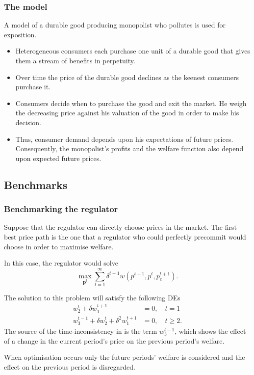 \documentclass{beamer}
\begin{document}
\begin{frame}
  \frametitle{The model}
  A model of a durable good producing monopolist who pollutes is used
  for exposition.
  \begin{itemize}
  \item<1-> Heterogeneous consumers each purchase one unit of a
    durable good that gives them a stream of benefits in perpetuity.
  \item<2-> Over time the price of the durable good declines as the
    keenest consumers purchase it.
  \item<3-> Consumers decide when to purchase the good and exit the
    market. He weigh the decreasing price against his valuation of the
    good in order to make his decision.
  \item<4-> Thus, consumer demand depends upon his expectations of
    future prices. Consequently, the monopolist's profits and the
    welfare function also depend upon expected future prices.
  \end{itemize}
\end{frame}


\subsection{Benchmarks}

\begin{frame}
  \frametitle{Benchmarking the regulator}
  Suppose that the regulator can directly choose prices in the
  market. The first-best price path is the one that a regulator who
  could perfectly precommit would choose in order to maximise welfare.

  In this case, the regulator would solve
  \begin{equation}\label{eq:1}
    \max_{\mathbf{p}^t} \sum^\infty_{t=1} \delta^{t-1}
    w(p^{t-1},p^t,p^{t+1}_e).
  \end{equation}
\end{frame}

\begin{frame}
  The solution to this problem will satisfy the following DEs
  \begin{align}
    w^t_2 + \delta w^{t+1}_1 & = 0, \quad t=1 \label{four}\\
    w^{t-1}_3 + \delta w^t_2 + \delta^2 w^{t+1}_1 & = 0, \quad t \geq
    2 \label{five}.
  \end{align}
  The source of the time-inconsistency in is the term $w^{t-1}_3$,
  which shows the effect of a change in the current period's price on
  the previous period's welfare.

  When optimisation occurs only the future periods' welfare is
  considered and the effect on the previous period is disregarded.
\end{frame}
\end{document}
